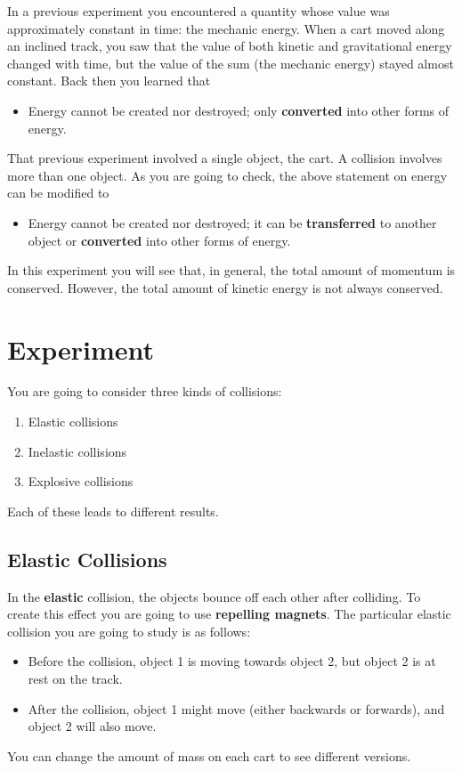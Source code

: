 In a previous experiment you encountered a quantity whose value was approximately constant in time: the mechanic energy. When a cart moved along an inclined track, you saw that the value of both kinetic and gravitational energy changed with time, but the value of the sum (the mechanic energy) stayed almost constant. Back then you learned that
\begin{itemize}
    \item Energy cannot be created nor destroyed; only \textbf{converted} into other forms of energy.
\end{itemize}
That previous experiment involved a single object, the cart. A collision involves more than one object. As you are going to check, the above statement on energy can be modified to
\begin{itemize}
    \item Energy cannot be created nor destroyed; it can be \textbf{transferred} to another object or \textbf{converted} into other forms of energy.
\end{itemize}
In this experiment you will see that, in general, the total amount of momentum is conserved. However, the total amount of kinetic energy is not always conserved.
\section{Experiment}
You are going to consider three kinds of collisions:
\begin{enumerate}
    \item Elastic collisions
    \item Inelastic collisions
    \item Explosive collisions
\end{enumerate}
Each of these leads to different results.
\subsection{Elastic Collisions}
In the \textbf{elastic} collision, the objects bounce off each other after colliding. To create this effect you are going to use \textbf{repelling magnets}. The particular elastic collision you are going to study is as follows:
\begin{itemize}
    \item Before the collision, object 1 is moving towards object 2, but object 2 is at rest on the track.
    \item After the collision, object 1 might move (either backwards or forwards), and object 2 will also move.
\end{itemize}
You can change the amount of mass on each cart to see different versions.
